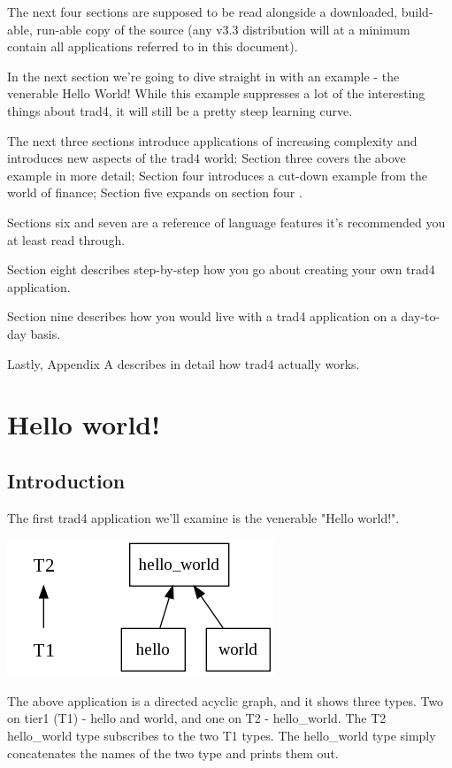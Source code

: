 \documentclass{report}
\begin{document}
The next four sections are supposed to be read alongside a downloaded, build-able, run-able copy of the source (any v3.3 distribution will at a minimum contain all applications referred to in this document).

In the next section we're going to dive straight in with an example - the venerable Hello World! While this example suppresses a lot of the interesting things about trad4, it will still be a pretty steep learning curve.

The next three sections introduce applications of increasing complexity and introduces new aspects of the trad4 world: Section three covers the above example in more detail; Section four introduces a cut-down example from the world of finance; Section five expands on section four .

Sections six and seven are a reference of language features it's recommended you at least read through.

Section eight describes step-by-step how you go about creating your own trad4 application.

Section nine describes how you would live with a trad4 application on a day-to-day basis.

Lastly, Appendix A describes in detail how trad4 actually works.


\chapter{Hello world!}

\section{Introduction}

The first trad4 application we'll examine is the venerable "Hello world!".

\includegraphics[scale=0.5]{helloworldabstract.png}

The above application is a directed acyclic graph, and it shows three types. Two on tier1 (T1) - hello and world, and one on T2 - hello_world. The T2 hello_world type subscribes to the two T1 types. The hello_world type simply concatenates the names of the two type and prints them out.
\end{document}
